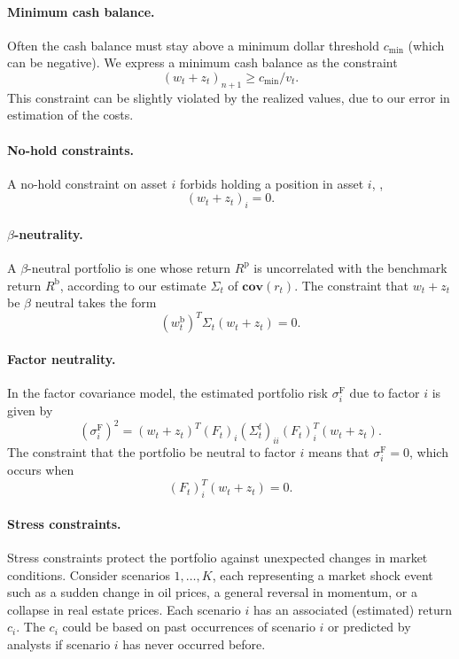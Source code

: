 \documentclass[openany]{now}
\newcommand{\cov}{\mathbf{cov}}
\newcommand{\Rp}{R^\mathrm{p}}
\newcommand{\Rb}{R^\mathrm{b}}
\begin{document}
\paragraph{Minimum cash balance.}
Often the cash balance must stay above a minimum dollar threshold $c_\mathrm{min}$
(which can be negative).
We express a minimum cash balance as the constraint
\[
(w_t + z_t)_{n+1} \geq c_\mathrm{min}/v_t.
\]
This constraint can be slightly violated by the realized values, due to
our error in estimation of the costs.

\paragraph{No-hold constraints.}
A no-hold constraint on asset $i$ forbids holding a position in asset $i$,
\ie,
\[
(w_t + z_t)_i = 0.
\]

\paragraph{$\beta$-neutrality.}
A $\beta$-neutral portfolio is one whose return $\Rp$
is uncorrelated with the benchmark return $\Rb$, according to our
estimate $\Sigma_t$ of $\cov(r_t)$.
The constraint that $w_t + z_t$ be $\beta$ neutral takes the form
\[
(w^\mathrm{b}_t)^T \Sigma_t (w_t + z_t) = 0.
\]

\paragraph{Factor neutrality.}
In the factor covariance model, the estimated
portfolio risk $\sigma^\mathrm{F}_i$ due to factor $i$ is given by
\[
\left( \sigma^\mathrm{F}_i\right)^2
= (w_t + z_t)^T (F_t)_i (\Sigma^\text{f}_t)_{ii} (F_t)_i^T (w_t + z_t).
\]
The constraint that the portfolio be neutral to factor $i$ means that
$\sigma^\mathrm{F}_i = 0$,
which occurs when
\[
(F_t)_i^T (w_t + z_t) = 0.
\]

\paragraph{Stress constraints.}

Stress constraints protect the portfolio against unexpected changes in market
conditions.
Consider scenarios $1,\ldots,K$, each representing a market shock event
such as a sudden change in oil prices,
a general reversal in momentum, or a collapse in real estate prices.
Each scenario $i$ has an associated (estimated) return $c_i$.
The $c_i$ could be based on past occurrences of scenario $i$
or predicted by analysts
if scenario $i$ has never occurred before.
\end{document}
